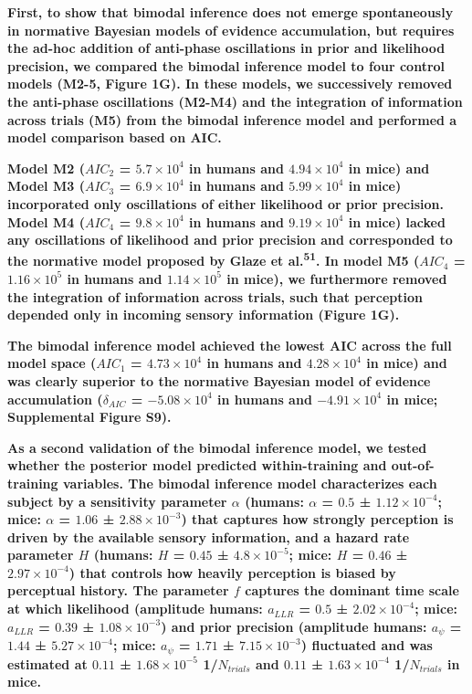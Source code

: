 \documentclass[
]{article}
\begin{document}
\textbf{First, to show that bimodal inference does not emerge
spontaneously in normative Bayesian models of evidence accumulation, but
requires the ad-hoc addition of anti-phase oscillations in prior and
likelihood precision, we compared the bimodal inference model to four
control models (M2-5, Figure 1G). In these models, we successively
removed the anti-phase oscillations (M2-M4) and the integration of
information across trials (M5) from the bimodal inference model and
performed a model comparison based on AIC.}

\textbf{Model M2 (\(AIC_2\) = \(\ensuremath{5.7\times 10^{4}}\) in
humans and \(\ensuremath{4.94\times 10^{4}}\) in mice) and Model M3
(\(AIC_3\) = \(\ensuremath{6.9\times 10^{4}}\) in humans and
\(\ensuremath{5.99\times 10^{4}}\) in mice) incorporated only
oscillations of either likelihood or prior precision. Model M4
(\(AIC_4\) = \(\ensuremath{9.8\times 10^{4}}\) in humans and
\(\ensuremath{9.19\times 10^{4}}\) in mice) lacked any oscillations of
likelihood and prior precision and corresponded to the normative model
proposed by Glaze et al.\textsuperscript{51}. In model M5 (\(AIC_4\) =
\(\ensuremath{1.16\times 10^{5}}\) in humans and
\(\ensuremath{1.14\times 10^{5}}\) in mice), we furthermore removed the
integration of information across trials, such that perception depended
only in incoming sensory information (Figure 1G).}

\textbf{The bimodal inference model achieved the lowest AIC across the
full model space (\(AIC_1\) = \(\ensuremath{4.73\times 10^{4}}\) in
humans and \(\ensuremath{4.28\times 10^{4}}\) in mice) and was clearly
superior to the normative Bayesian model of evidence accumulation
(\(\delta_{AIC}\) = \(\ensuremath{-5.08\times 10^{4}}\) in humans and
\(\ensuremath{-4.91\times 10^{4}}\) in mice; Supplemental Figure S9).}

\textbf{As a second validation of the bimodal inference model, we tested
whether the posterior model predicted within-training and
out-of-training variables. The bimodal inference model characterizes
each subject by a sensitivity parameter \(\alpha\) (humans: \(\alpha\) =
\(0.5\) ± \(\ensuremath{1.12\times 10^{-4}}\); mice: \(\alpha\) =
\(1.06\) ± \(\ensuremath{2.88\times 10^{-3}}\)) that captures how
strongly perception is driven by the available sensory information, and
a hazard rate parameter \(H\) (humans: \(H\) = \(0.45\) ±
\(\ensuremath{4.8\times 10^{-5}}\); mice: \(H\) = \(0.46\) ±
\(\ensuremath{2.97\times 10^{-4}}\)) that controls how heavily
perception is biased by perceptual history. The parameter \(f\) captures
the dominant time scale at which likelihood (amplitude humans:
\(a_{LLR}\) = \(0.5\) ± \(\ensuremath{2.02\times 10^{-4}}\); mice:
\(a_{LLR}\) = \(0.39\) ± \(\ensuremath{1.08\times 10^{-3}}\)) and prior
precision (amplitude humans: \(a_{\psi}\) = \(1.44\) ±
\(\ensuremath{5.27\times 10^{-4}}\); mice: \(a_{\psi}\) = \(1.71\) ±
\(\ensuremath{7.15\times 10^{-3}}\)) fluctuated and was estimated at
\(0.11\) ± \(\ensuremath{1.68\times 10^{-5}}\) 1/\(N_{trials}\) and
\(0.11\) ± \(\ensuremath{1.63\times 10^{-4}}\) 1/\(N_{trials}\) in
mice.}
\end{document}
